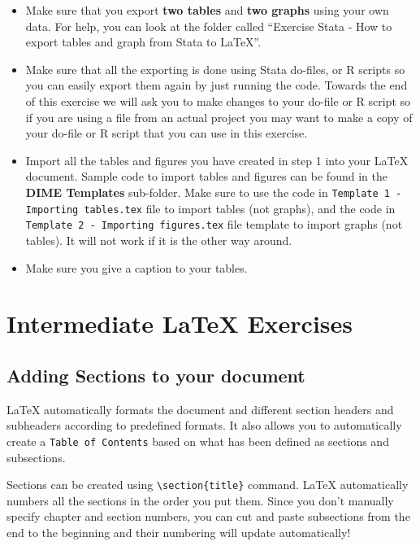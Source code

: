 \documentclass[12pts]{article}
\begin{document}
\begin{minipage}{\textwidth}
	\begin{itemize}
		\item Make sure that you export \textbf{two tables} and \textbf{two graphs} using your own data. For help, you can look at the folder called ``Exercise Stata - How to export tables and graph from Stata to LaTeX''.
		\item Make sure that all the exporting is done using Stata do-files, or R scripts so you can easily export them again by just running the code. Towards the end of this exercise we will ask you to make changes to your do-file or R script so if you are using a file from an actual project you may want to make a copy of your do-file or R script that you can use in this exercise.
		\item Import all the tables and figures you have created in step 1 into your {\LaTeX} document. Sample code to import tables and figures can be found in the \textbf{DIME Templates} sub-folder. Make sure to use the  code in \texttt{Template 1 - Importing tables.tex} file to import tables (not graphs), and the code in \texttt{Template 2 - Importing figures.tex} file template to import graphs (not tables). It will not work if it is the other way around.
		\item Make sure you give a caption to your tables. 
	\end{itemize}
	\end{minipage}
	
	
	\section{Intermediate {\LaTeX} Exercises}
	\subsection{Adding Sections to your document}
	{\LaTeX} automatically formats the document and different section headers and subheaders according to predefined formats. It also allows you to automatically create a \texttt{Table of Contents} based on what has been defined as sections and subsections. 
	
	Sections can be created using \verb|\section{title}| command. {\LaTeX} automatically numbers all the sections in the order you put them. Since you don't manually specify chapter and section numbers, you can cut and paste subsections from the end to the beginning and their numbering will update automatically! 
	
\end{document}
